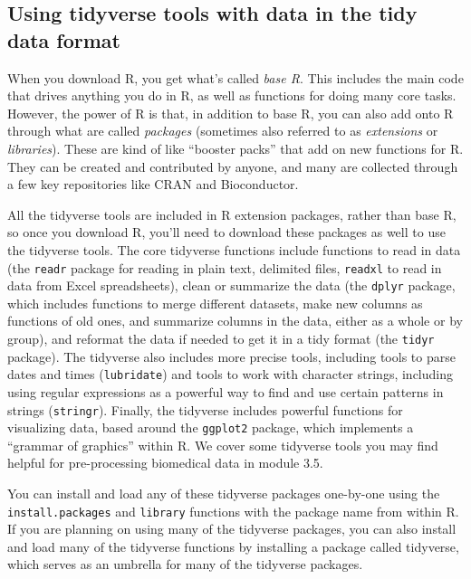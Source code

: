 \documentclass[]{tufte-book}
\begin{document}
\subsection{Using tidyverse tools with data in the tidy data format}\label{using-tidyverse-tools-with-data-in-the-tidy-data-format}

When you download R, you get what's called \emph{base R}. This includes the main code
that drives anything you do in R, as well as functions for doing many core
tasks. However, the power of R is that, in addition to base R, you can also add
onto R through what are called \emph{packages} (sometimes also referred to as
\emph{extensions} or \emph{libraries}). These are kind of like ``booster packs'' that add on
new functions for R. They can be created and contributed by anyone, and many are
collected through a few key repositories like CRAN and Bioconductor.

All the tidyverse tools are included in R extension packages, rather than base
R, so once you download R, you'll need to download these packages as well to use
the tidyverse tools. The core tidyverse functions include functions to read in
data (the \texttt{readr} package for reading in plain text, delimited files, \texttt{readxl}
to read in data from Excel spreadsheets), clean or summarize the data (the
\texttt{dplyr} package, which includes functions to merge different datasets, make
new columns as functions of old ones, and summarize columns in the data, either
as a whole or by group), and reformat the data if needed to get it in a tidy
format (the \texttt{tidyr} package). The tidyverse also includes more precise tools,
including tools to parse dates and times (\texttt{lubridate}) and tools to work with
character strings, including using regular expressions as a powerful way to find
and use certain patterns in strings (\texttt{stringr}). Finally, the tidyverse
includes powerful functions for visualizing data, based around the \texttt{ggplot2}
package, which implements a ``grammar of graphics'' within R. We cover some
tidyverse tools you may find helpful for pre-processing biomedical data in
module 3.5.

You can install and load any of these tidyverse packages one-by-one using the
\texttt{install.packages} and \texttt{library} functions with the package name from within R.
If you are planning on using many of the tidyverse packages, you can also
install and load many of the tidyverse functions by installing a package called
tidyverse, which serves as an umbrella for many of the tidyverse packages.
\end{document}
